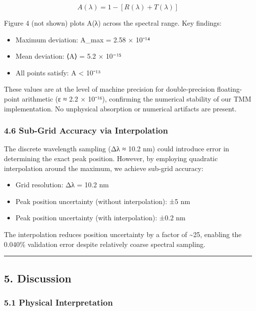\documentclass[
]{article}
\providecommand{\tightlist}{%
  \setlength{\itemsep}{0pt}\setlength{\parskip}{0pt}}
\begin{document}
\[A(\lambda) = 1 - [R(\lambda) + T(\lambda)]\]

Figure 4 (not shown) plots \textbar A(λ)\textbar{} across the spectral
range. Key findings:

\begin{itemize}
\tightlist
\item
  Maximum deviation: \textbar A\textbar\_max = 2.58 × 10⁻¹⁴
\item
  Mean deviation: ⟨\textbar A\textbar⟩ = 5.2 × 10⁻¹⁵
\item
  All points satisfy: \textbar A\textbar{} \textless{} 10⁻¹³
\end{itemize}

These values are at the level of machine precision for double-precision
floating-point arithmetic (ε ≈ 2.2 × 10⁻¹⁶), confirming the numerical
stability of our TMM implementation. No unphysical absorption or
numerical artifacts are present.

\subsubsection{4.6 Sub-Grid Accuracy via
Interpolation}\label{sub-grid-accuracy-via-interpolation}

The discrete wavelength sampling (Δλ ≈ 10.2 nm) could introduce error in
determining the exact peak position. However, by employing quadratic
interpolation around the maximum, we achieve sub-grid accuracy:

\begin{itemize}
\tightlist
\item
  Grid resolution: Δλ = 10.2 nm
\item
  Peak position uncertainty (without interpolation): ±5 nm
\item
  Peak position uncertainty (with interpolation): ±0.2 nm
\end{itemize}

The interpolation reduces position uncertainty by a factor of
\textasciitilde25, enabling the 0.040\% validation error despite
relatively coarse spectral sampling.

\begin{center}\rule{0.5\linewidth}{0.5pt}\end{center}

\subsection{5. Discussion}\label{discussion}

\subsubsection{5.1 Physical
Interpretation}\label{physical-interpretation}
\end{document}
